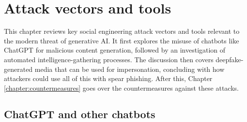 



\chapter{Attack vectors and tools \label{chapter:attacks}}
\begin{comment}

Guides:
    - About 3-4 pages

TODO:
    [ ] 

What to cover:
    - Attacks
        - Deepfake generated synthetic media
            - Videos
            - Images
            - Audio
            - Real-time voice morphing

Sections:
    - Attack Vectors and Tools
        - Chatbots
        - Automated intelligence gathering
        - Deepfake-generated media
        - Phishing & spear phishing

\end{comment}

This chapter reviews key social engineering attack vectors and tools relevant to the modern threat of generative AI. It first explores the misuse of chatbots like ChatGPT for malicious content generation, followed by an investigation of automated intelligence-gathering processes. The discussion then covers deepfake-generated media that can be used for impersonation, concluding with how attackers could use all of this with spear phishing. After this, Chapter \ref{chapter:countermeasures} goes over the countermeasures against these attacks.














\section{ChatGPT and other chatbots}

\begin{comment}

What to cover:
    - Mitä ovat chatbotit kuten ChatGPT
    - How Generative AI can be used by both cybersecurity professionals and threat actors
    - Circumventing ChatGPT's ethical restrictions with, for example prompt injections attacks or reverse psychology (with at least 1-2 examples)
    - How scholars and regular users have found ways to bypass ChatGPT's ethical restrictions??
    - Tekoälyn päivitys kun löydetään uusia tapoja ohittaa sen eettiset ohjeistukset ja kehittäjien asettamat rajoitukset
    - Pyydetään tekoälyä roolipelaamaan social engineering skenaarioita
    - Kielioppi ja kirjoitusvirheiden korjaus scam viesteissä
    - Generation of malware?
    - Analysis of gathered data to find insights to be used against the victim
    
\end{comment}

